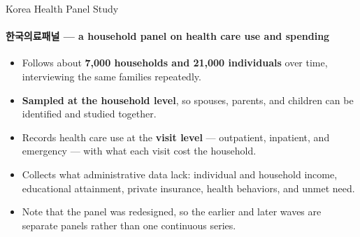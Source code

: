 \documentclass[aspectratio=169,11pt]{beamer}
\newcommand{\hl}[1]{\textbf{\color{kdgreen}#1}}
\begin{document}
\begin{frame}{Korea Health Panel Study}
  \framesubtitle{한국의료패널 --- a household panel on health care use and spending}
  \begin{itemize}
    \setlength{\itemsep}{8pt}
    \item Follows about \hl{7,000 households and 21,000 individuals} over time,
          interviewing the same families repeatedly.
    \item \hl{Sampled at the household level}, so spouses, parents, and children can be
          identified and studied together.
    \item Records health care use at the \hl{visit level} --- outpatient, inpatient, and
          emergency --- with what each visit cost the household.
    \item Collects what administrative data lack: individual and household income,
          educational attainment, private insurance, health behaviors, and
          unmet need.
    \item Note that the panel was redesigned, so the earlier and later waves are
          separate panels rather than one continuous series.
  \end{itemize}
\end{frame}
\end{document}
